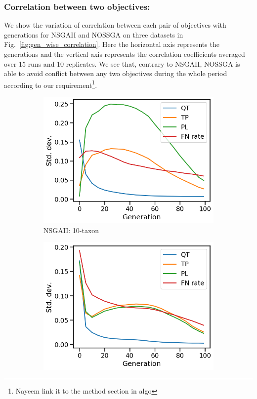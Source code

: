 \subsubsection{Correlation between two objectives:} We show the variation of correlation between each pair of objectives with generations for NSGAII and NOSSGA on three datasets in Fig.~\ref{fig:gen_wise_correlation}. Here the horizontal axis represents the generations and the vertical axis represents the correlation coefficients averaged over 15 runs and 10 replicates. We see that, contrary to NSGAII, NOSSGA is able to avoid conflict between any two objectives during the whole period according to our requirement\footnote{Nayeem link it to the method section in algo}. 

\begin{figure}[!htbp]
	\centering
	\begin{adjustwidth}{-1cm}{-1cm}
		\begin{subfigure}[b]{0.4\textwidth}
			\includegraphics[width=\textwidth]{Figure/10-taxon_NSGAII_std_dev}
			\caption{NSGAII: 10-taxon}
		\end{subfigure}%
		\begin{subfigure}[b]{0.4\textwidth}
			\includegraphics[width=\textwidth]{Figure/11-taxon_NSGAII_std_dev}

\end{subfigure}
\end{adjustwidth}
\end{figure}
